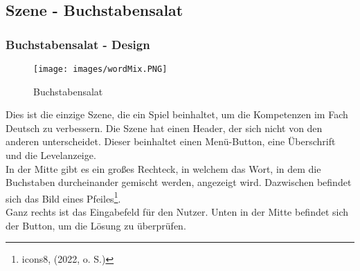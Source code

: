 \subsection{Szene - Buchstabensalat}
\subsubsection{Buchstabensalat - Design}
\begin{figure}[htbp]
  \centering
  \texttt{[image: images/wordMix.PNG]}
  \caption{Buchstabensalat}
  \label{wordMix}
\end{figure}
Dies ist die einzige Szene, die ein Spiel beinhaltet, um die Kompetenzen im Fach Deutsch zu verbessern. Die Szene hat einen Header, der sich nicht von den anderen unterscheidet. Dieser beinhaltet einen Menü-Button, eine Überschrift und die Levelanzeige.\\
In der Mitte gibt es ein großes Rechteck, in welchem das Wort, in dem die Buchstaben durcheinander gemischt werden, angezeigt wird. Dazwischen befindet sich das Bild eines Pfeiles\footnote{icons8, (2022, o. S.)}.\\ %
Ganz rechts ist das Eingabefeld für den Nutzer. Unten in der Mitte befindet sich der Button, um die Lösung zu überprüfen.
